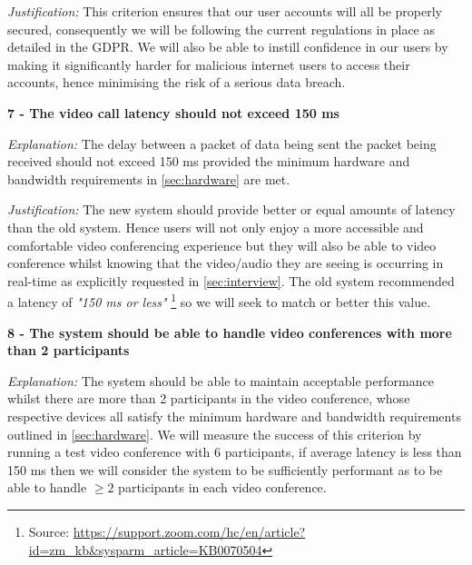 \vspace{0.1cm}

\textit{Justification:}
This criterion ensures that our user accounts will all
be properly secured, consequently we will be following
the current regulations in place as detailed in the
GDPR. We will also be able to instill confidence in our
users by making it significantly harder for malicious
internet users to access their accounts, hence minimising
the risk of a serious data breach.

\vspace{0.2cm}

\textsf{\bfseries 7 - The video call latency should not exceed 150 ms}

\vspace{0.1cm}

\textit{Explanation:}
The delay between a packet of data being sent the packet
being received should not exceed 150 ms provided the minimum
hardware and bandwidth requirements in \ref{sec:hardware}
are met.

\vspace{0.1cm}

\textit{Justification:}
The new system should provide better or equal amounts of
latency than the old system. Hence users will not only enjoy
a more accessible and comfortable video conferencing
experience but they will also be able to video conference
whilst knowing that the video/audio they are seeing is
occurring in real-time as explicitly requested in
\ref{sec:interview}. The old system recommended a latency of
\textit{"150 ms or less"} \footnote{Source:
\url{https://support.zoom.com/hc/en/article?id=zm_kb&sysparm_article=KB0070504}}
so we will seek to match or better this value.

\vspace{0.2cm}

\textsf{\bfseries 8 - The system should be able to handle video
conferences with more than 2 participants}

\vspace{0.1cm}

\textit{Explanation:}
The system should be able to maintain acceptable performance
whilst there are more than 2 participants in the video
conference, whose respective devices all satisfy the minimum
hardware and bandwidth requirements outlined in
\ref{sec:hardware}. We will measure the success of this
criterion by running a test video conference with 6
participants, if average latency is less than 150 ms then we
will consider the system to be sufficiently performant as to
be able to handle $\geq 2$ participants in each video
conference.
\vspace{0.1cm}


